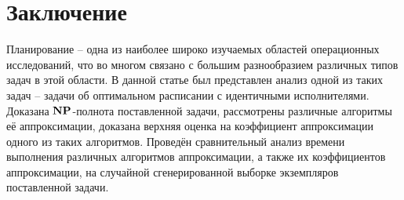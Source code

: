 \newpage
\section{Заключение}

Планирование -- одна из наиболее широко изучаемых областей операционных исследований, что во многом связано с большим разнообразием различных типов задач в этой области. В данной статье был представлен анализ одной из таких задач -- задачи об оптимальном расписании с идентичными исполнителями. Доказана $\bf{NP}$-полнота поставленной задачи, рассмотрены различные алгоритмы её аппроксимации, доказана верхняя оценка на коэффициент аппроксимации одного из таких алгоритмов. Проведён сравнительный анализ времени выполнения различных алгоритмов аппроксимации, а также их коэффициентов аппроксимации, на случайной сгенерированной выборке экземпляров поставленной задачи. 